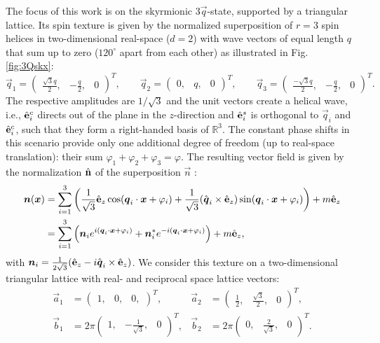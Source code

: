 \documentclass[submission, Phys]{SciPost}
\begin{document}
The focus of this work is on the skyrmionic $3\vec{q}$-state, supported by a triangular lattice.
Its spin texture is given by the normalized superposition of $r=3$ spin helices in two-dimensional real-space ($d=2$) with wave vectors of equal length $q$ that sum up to zero ($120^\circ$ apart from each other) as illustrated in Fig. \ref{fig:3Qskx}:
\begin{equation}
    \vec{q}_1=\begin{pmatrix} \frac{\sqrt{3}q}{2}, & -\frac{q}{2}, & 0 \end{pmatrix}^T,\qquad
    \vec{q}_2=\begin{pmatrix} 0, & q, & 0 \end{pmatrix}^T,\qquad
    \vec{q}_3=\begin{pmatrix} \frac{-\sqrt{3}q}{2}, & -\frac{q}{2}, & 0 \end{pmatrix}^T.
\end{equation}
The respective amplitudes are $1/\sqrt{3}$ and the unit vectors create a helical wave, i.e., $\hat{\mathbf{e}}_i^c$ directs out of the plane in the $z$-direction and $\hat{\mathbf{e}}_i^s$ is orthogonal to $\vec{q}_i$ and $\hat{\mathbf{e}}_i^c$, such that they form a right-handed basis of $\mathbb{R}^3$. 
The constant phase shifts in this scenario provide only one additional degree of freedom (up to real-space translation): their sum $\varphi_1+\varphi_2+\varphi_3=\varphi$. The resulting vector field is given by the normalization $\hat{\mathbf{n}}$ of the superposition $\vec{n}$ \cite{Shimizu2022}:
\begin{align}
    \boldsymbol{n}(\boldsymbol{x})
    &= \sum_{i=1}^3 \left(\frac{1}{\sqrt{3}} \hat{\mathbf{e}}_z \cos(\boldsymbol{q}_i\cdot\boldsymbol{x}+\varphi_i) + \frac{1}{\sqrt{3}} (\hat{\boldsymbol{q}}_i\times\hat{\mathbf{e}}_z) \sin(\boldsymbol{q}_i\cdot\boldsymbol{x}+\varphi_i) \right) + m \hat{\mathbf{e}}_z \label{eq:skx_texture}\\
    &= \sum_{i=1}^3 \left(\boldsymbol{n}_i e^{i(\boldsymbol{q}_i\cdot\boldsymbol{x}+\varphi_{i})} + \boldsymbol{n}_i^* e^{-i(\boldsymbol{q}_i\cdot\boldsymbol{x}+\varphi_{i})} \right) + m \hat{\mathbf{e}}_z,
\end{align}
with $\boldsymbol{n}_i=\frac{1}{2\sqrt{3}}(\hat{\mathbf{e}}_z - i \hat{\boldsymbol{q}}_i\times\hat{\mathbf{e}}_z)$. We consider this texture on a two-dimensional triangular lattice with real- and reciprocal space lattice vectors:
\begin{align}
    \vec{a}_1&=\begin{pmatrix} 1, & 0, & 0 ,\end{pmatrix}^T, &
    \vec{a}_2&=\begin{pmatrix} \frac{1}{2}, & \frac{\sqrt{3}}{2}, & 0 \end{pmatrix}^T,\\
    \vec{b}_1&=2\pi \begin{pmatrix} 1, & -\frac{1}{\sqrt{3}}, & 0 \end{pmatrix}^T, &
    \vec{b}_2&=2\pi \begin{pmatrix} 0, & \frac{2}{\sqrt{3}}, & 0 \end{pmatrix}^T.
\end{align}
\end{document}
